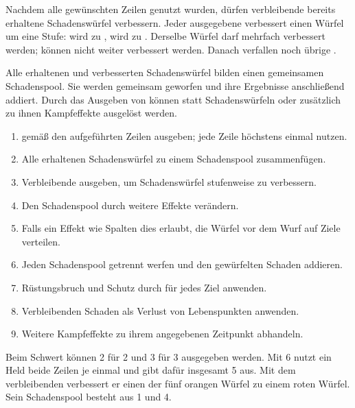 Nachdem alle gewünschten Zeilen genutzt wurden, dürfen verbleibende \star{} bereits erhaltene Schadenswürfel verbessern. Jeder ausgegebene \star{} verbessert einen Würfel um eine Stufe: \orangeDmgDie{} wird zu \redDmgDie{}, \redDmgDie{} wird zu \blackDmgDie{}. Derselbe Würfel darf mehrfach verbessert werden; \blackDmgDie{} können nicht weiter verbessert werden. Danach verfallen noch übrige \star{}.

Alle erhaltenen und verbesserten Schadenswürfel bilden einen gemeinsamen Schadenspool. Sie werden gemeinsam geworfen und ihre Ergebnisse anschließend addiert. Durch das Ausgeben von \star{} können statt Schadenswürfeln oder zusätzlich zu ihnen Kampfeffekte ausgelöst werden.

\begin{kurzregel}[title=Schaden bestimmen]
\begin{enumerate}
  \item \star{} gemäß den aufgeführten Zeilen ausgeben; jede Zeile höchstens einmal nutzen.
  \item Alle erhaltenen Schadenswürfel zu einem Schadenspool zusammenfügen.
  \item Verbleibende \star{} ausgeben, um Schadenswürfel stufenweise zu verbessern.
  \item Den Schadenspool durch weitere Effekte verändern.
  \item Falls ein Effekt wie Spalten dies erlaubt, die Würfel vor dem Wurf auf Ziele verteilen.
  \item Jeden Schadenspool getrennt werfen und den gewürfelten Schaden addieren.
  \item Rüstungsbruch und Schutz durch \armor{} für jedes Ziel anwenden.
  \item Verbleibenden Schaden als Verlust von Lebenspunkten anwenden.
  \item Weitere Kampfeffekte zu ihrem angegebenen Zeitpunkt abhandeln.
\end{enumerate}
\end{kurzregel}

\begin{beispiel}[title=Beispiel: Sterne für Schadenswürfel ausgeben und Würfel verbessern]
Beim Schwert können 2\star{} für 2\orangeDmgDie{} und 3\star{} für 3\orangeDmgDie{} ausgegeben werden. Mit 6\star{} nutzt ein Held beide Zeilen je einmal und gibt dafür insgesamt 5\star{} aus. Mit dem verbleibenden \star{} verbessert er einen der fünf orangen Würfel zu einem roten Würfel. Sein Schadenspool besteht aus 1\redDmgDie{} und 4\orangeDmgDie{}.
\end{beispiel}

